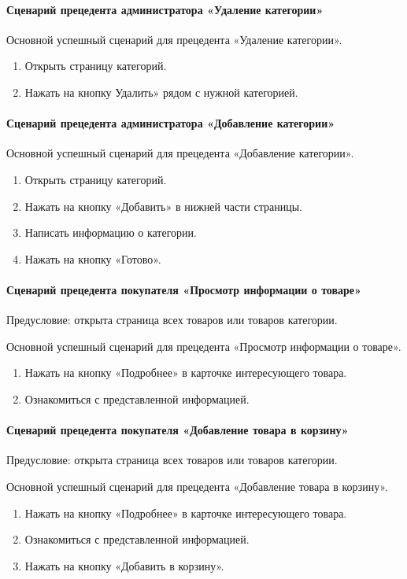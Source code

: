 \paragraph{Сценарий прецедента администратора «Удаление категории»}

Основной успешный сценарий для прецедента «Удаление категории».
\begin{enumerate}
	\item Открыть страницу категорий.
	\item Нажать на кнопку Удалить» рядом с нужной категорией.
\end{enumerate}

\paragraph{Сценарий прецедента администратора «Добавление категории»}

Основной успешный сценарий для прецедента «Добавление категории».
\begin{enumerate}
	\item Открыть страницу категорий.
	\item Нажать на кнопку «Добавить» в нижней части страницы.
	\item Написать информацию о категории.
	\item Нажать на кнопку «Готово».
\end{enumerate}


\paragraph{Сценарий прецедента покупателя «Просмотр информации о товаре»}
Предусловие: открыта страница всех товаров или товаров категории.

Основной успешный сценарий для прецедента «Просмотр информации о товаре».
\begin{enumerate}
	\item Нажать на кнопку «Подробнее» в карточке интересующего товара.
	\item Ознакомиться с представленной информацией.
\end{enumerate}

\paragraph{Сценарий прецедента покупателя «Добавление товара в корзину»}
Предусловие: открыта страница всех товаров или товаров категории.

Основной успешный сценарий для прецедента «Добавление товара в корзину».
\begin{enumerate}
	\item Нажать на кнопку «Подробнее» в карточке интересующего товара.
	\item Ознакомиться с представленной информацией.
	\item Нажать на кнопку «Добавить в корзину».
\end{enumerate}

